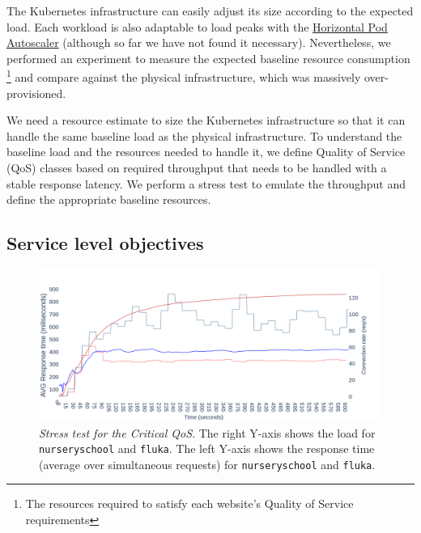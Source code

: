 The Kubernetes infrastructure can easily adjust its size according to the expected load.
Each workload is also adaptable to load peaks with the \href{https://kubernetes.io/docs/tasks/run-application/horizontal-pod-autoscale/}{Horizontal Pod Autoscaler}
(although so far we have not found it necessary).
Nevertheless, we performed an experiment to measure the expected baseline resource consumption
\footnote{The resources required to satisfy each website's Quality of Service requirements}
and compare against the physical infrastructure, which was massively over-provisioned.

We need a resource estimate to size the Kubernetes infrastructure so that it can handle the same baseline load as the physical infrastructure.
To understand the baseline load and the resources needed to handle it, we define Quality of Service (QoS) classes based on required throughput
that needs to be handled with a stable response latency.
We perform a stress test to emulate the throughput and define the appropriate baseline resources.

\subsection{Service level objectives}

\begin{figure}[t]
\centering
\captionsetup{justification=centering,margin=0.3cm}
\vspace{-2em}
\includegraphics[width=1.1\linewidth]{figures/experiment-figures/critical_run.png}
\caption{\emph{Stress test for the Critical QoS}.
The right Y-axis shows the load for {\color[HTML]{F66565} \texttt{nurseryschool}} and {\color[HTML]{5D8AA8} \texttt{fluka}}.
The left Y-axis shows the response time (average over simultaneous requests) for {\color[HTML]{D23232} \texttt{nurseryschool}} and {\color[HTML]{0000FF} \texttt{fluka}}.}
\label{stress_usage}
\vspace{-2em}
\end{figure}

